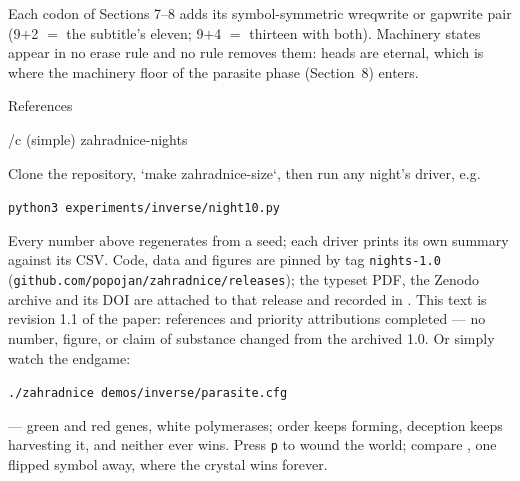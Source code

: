 \noindent Each codon of Sections 7--8 adds its symbol-symmetric
wreqwrite or gapwrite pair (9${+}$2 $=$ the subtitle's eleven;
9${+}$4 $=$ thirteen with both). Machinery states appear in no
erase rule and no rule removes them: heads are eternal, which is
where the machinery floor of the parasite phase (Section~8)
enters.

\sec References

\usebib/c (simple) zahradnice-nights

\medskip
{} Clone the repository, `make
zahradnice-size`, then run any night's driver, e.g.
\medskip
\centerline{\tt python3 experiments/inverse/night10.py}
\medskip
\noindent Every number above regenerates from a seed; each driver
prints its own summary against its CSV. Code, data and figures are
pinned by tag {\tt nights-1.0}
({\tt github.com/popojan/zahradnice/releases}); the typeset PDF,
the Zenodo archive and its DOI are attached to that release and
recorded in . This text is revision 1.1 of
the paper: references and priority attributions completed --- no
number, figure, or claim of substance changed from the archived
1.0. Or simply watch the
endgame:
\medskip
\centerline{\tt ./zahradnice demos/inverse/parasite.cfg}
\medskip
\noindent --- green and red genes, white polymerases; order keeps
forming, deception keeps harvesting it, and neither ever wins.
Press {\tt p} to wound the world; compare
, one flipped symbol away, where the
crystal wins forever.

\bye
